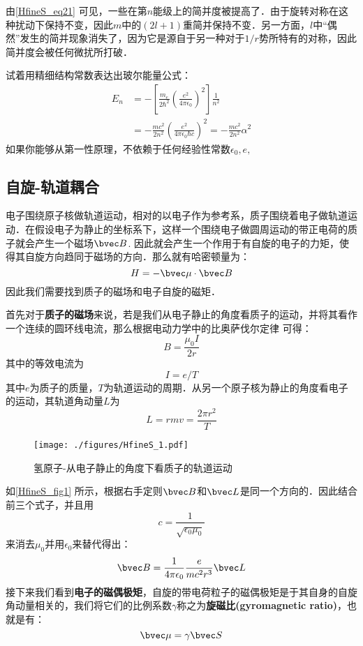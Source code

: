 由\autoref{HfineS_eq21} 可见，一些在第$n$能级上的简并度被提高了．由于旋转对称在这种扰动下保持不变，因此$m$中的$(2l+1)$重简并保持不变．另一方面，$l$中“偶然”发生的简并现象消失了，因为它是源自于另一种对于$1/r$势所特有的对称，因此简并度会被任何微扰所打破．
\begin{example}{}
试着用精细结构常数表达出玻尔能量公式：
\begin{align}
E_n&=-\left[\frac {m_e}{2\hbar^{2}} \left(\frac {e^ {2}}{4\pi \epsilon_0}\right)^ {2}\right]  \frac {1}{n^2}\\
&=-\frac{mc^2}{2n^2}\left(\frac {e^{2}}{4\pi \epsilon_0\hbar c}\right)^2=-\frac{mc^2}{2n^2}\alpha^2
\end{align}
如果你能够从第一性原理，不依赖于任何经验性常数$\epsilon_0,e,$
\end{example}
\subsection{自旋-轨道耦合}
电子围绕原子核做轨道运动，相对的以电子作为参考系，质子围绕着电子做轨道运动．在假设电子为静止的坐标系下，这样一个围绕电子做圆周运动的带正电荷的质子就会产生一个磁场$\bvec B$. 因此就会产生一个作用于有自旋的电子的力矩，使得其自旋方向趋同于磁场的方向．那么就有哈密顿量为：
\begin{equation}
H=-\bvec\mu \cdot \bvec B
\end{equation}
因此我们需要找到质子的磁场和电子自旋的磁矩．

首先对于\textbf{质子的磁场}来说，若是我们从电子静止的角度看质子的运动，并将其看作一个连续的圆环线电流，那么根据电动力学中的比奥萨伐尔定律 可得：
\begin{equation}
B=\frac{\mu_0I}{2r}
\end{equation}
其中的等效电流为
\begin{equation}
I=e/T
\end{equation}
其中$e$为质子的质量，$T$为轨道运动的周期．从另一个原子核为静止的角度看电子的运动，其轨道角动量$L$为
\begin{equation}
L=rmv=\frac{2\pi r^2}{T}
\end{equation}
\begin{figure}[ht]
\centering
\texttt{[image: ./figures/HfineS\_1.pdf]}
\caption{氢原子-从电子静止的角度下看质子的轨道运动} \label{HfineS_fig1}
\end{figure}
如\autoref{HfineS_fig1} 所示，根据右手定则$\bvec B$和$\bvec L$是同一个方向的．因此结合前三个式子，并且用
\begin{equation}
c=\frac{1}{\sqrt{\epsilon_0\mu_0}}
\end{equation}
来消去$\mu_0$并用$\epsilon_0$来替代得出：
\begin{equation}
\bvec B = \frac{1}{4\pi\epsilon_0}\frac{e}{mc^2r^3}\bvec L
\end{equation}
接下来我们看到\textbf{电子的磁偶极矩}，自旋的带电荷粒子的磁偶极矩是于其自身的自旋角动量相关的，我们将它们的比例系数$\gamma$称之为\textbf{旋磁比(gyromagnetic
ratio)}，也就是有：
\begin{equation}
\bvec\mu=\gamma\bvec S
\end{equation}


